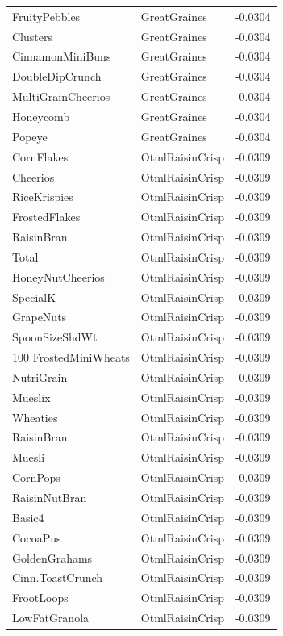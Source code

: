 \begin{longtable}{llr}
FruityPebbles & GreatGraines & -0.0304 \\
Clusters & GreatGraines & -0.0304 \\
CinnamonMiniBuns & GreatGraines & -0.0304 \\
DoubleDipCrunch & GreatGraines & -0.0304 \\
MultiGrainCheerios & GreatGraines & -0.0304 \\
Honeycomb & GreatGraines & -0.0304 \\
Popeye & GreatGraines & -0.0304 \\
CornFlakes & OtmlRaisinCrisp & -0.0309 \\
Cheerios & OtmlRaisinCrisp & -0.0309 \\
RiceKrispies & OtmlRaisinCrisp & -0.0309 \\
FrostedFlakes & OtmlRaisinCrisp & -0.0309 \\
RaisinBran & OtmlRaisinCrisp & -0.0309 \\
Total & OtmlRaisinCrisp & -0.0309 \\
HoneyNutCheerios & OtmlRaisinCrisp & -0.0309 \\
SpecialK & OtmlRaisinCrisp & -0.0309 \\
GrapeNuts & OtmlRaisinCrisp & -0.0309 \\
SpoonSizeShdWt & OtmlRaisinCrisp & -0.0309 \\
100%
FrostedMiniWheats & OtmlRaisinCrisp & -0.0309 \\
NutriGrain & OtmlRaisinCrisp & -0.0309 \\
Mueslix & OtmlRaisinCrisp & -0.0309 \\
Wheaties & OtmlRaisinCrisp & -0.0309 \\
RaisinBran & OtmlRaisinCrisp & -0.0309 \\
Muesli & OtmlRaisinCrisp & -0.0309 \\
CornPops & OtmlRaisinCrisp & -0.0309 \\
RaisinNutBran & OtmlRaisinCrisp & -0.0309 \\
Basic4 & OtmlRaisinCrisp & -0.0309 \\
CocoaPus & OtmlRaisinCrisp & -0.0309 \\
GoldenGrahams & OtmlRaisinCrisp & -0.0309 \\
Cinn.ToastCrunch & OtmlRaisinCrisp & -0.0309 \\
FrootLoops & OtmlRaisinCrisp & -0.0309 \\
LowFatGranola & OtmlRaisinCrisp & -0.0309 \\

\end{longtable}

